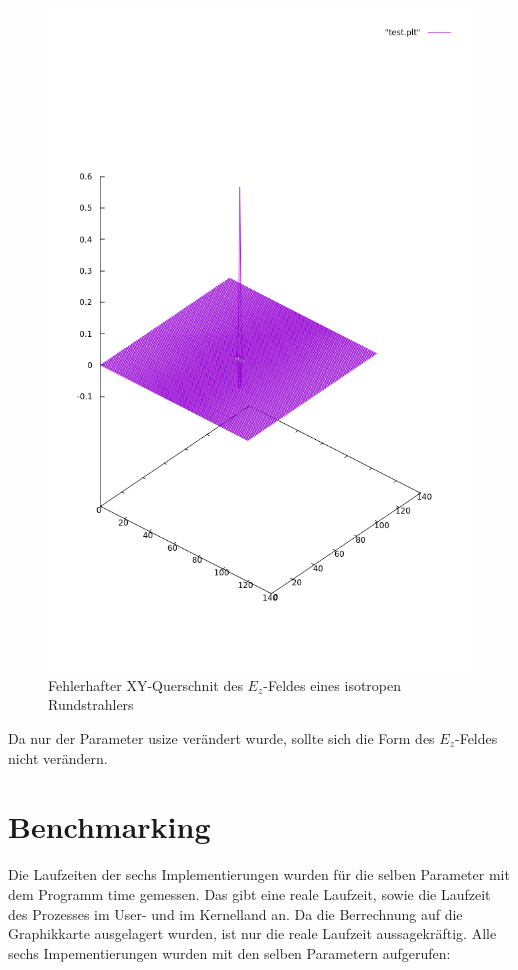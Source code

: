 \documentclass[11pt, ngerman]{article}
\begin{document}
\begin{figure}[H]
\includegraphics[width=\textwidth]{./fdtd_3d_iter_fehlerhaft}
	\caption{Fehlerhafter XY-Querschnit des \(E_z\)-Feldes eines isotropen Rundstrahlers}
\end{figure}
\noindent Da nur der Parameter usize ver\"andert wurde, sollte sich die Form des \(E_z\)-Feldes nicht ver\"andern.

\section{Benchmarking}
Die Laufzeiten der sechs Implementierungen wurden f\"ur die selben Parameter mit dem Programm
time gemessen. Das gibt eine reale Laufzeit, sowie die Laufzeit des Prozesses im User- und im Kernelland an.
Da die Berrechnung auf die Graphikkarte ausgelagert wurden, ist nur die reale Laufzeit aussagekr\"aftig.
Alle sechs Impementierungen wurden mit den selben Parametern aufgerufen:
\end{document}

